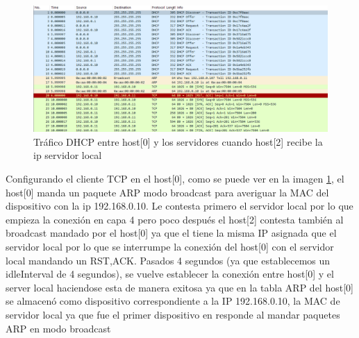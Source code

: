 \begin{figure}[!ht]
    \centering
    \includegraphics[width=135mm, scale=0.75]{imaxes/captura_ejer1_5.png}
    \caption{Tráfico DHCP entre host[0] y los servidores cuando host[2] recibe la ip servidor local}
    \label{fig:captura2_host0}
\end{figure}

Configurando el cliente TCP en el host[0], como se puede ver en la imagen \ref{fig:captura2_host0}, el host[0] manda un paquete ARP modo broadcast para averiguar la MAC del dispositivo con la ip 192.168.0.10. Le contesta primero el servidor local por lo que empieza la conexión en capa 4 pero poco después el host[2] contesta también al broadcast mandado por el host[0] ya que el tiene la misma IP asignada que el servidor local por lo que se interrumpe la conexión del host[0] con el servidor local mandando un RST,ACK. Pasados 4 segundos (ya que establecemos un idleInterval de 4 segundos), se vuelve establecer la conexión entre host[0] y el server local haciendose esta de manera exitosa ya que en la tabla ARP del host[0] se almacenó como dispositivo correspondiente a la IP 192.168.0.10, la MAC de servidor local ya que fue el primer dispositivo en responde al mandar paquetes ARP en modo broadcast 

